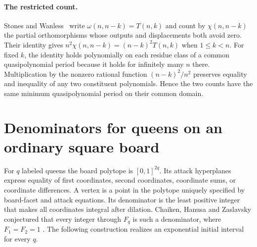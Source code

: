 \documentclass[10pt]{article}
\begin{document}
\paragraph{The restricted count.} Stones and Wanless~\cite{partial} write $\omega(n,n-k)=T(n,k)$ and count by $\chi(n,n-k)$ the partial orthomorphisms whose outputs and displacements both avoid zero. Their identity gives $n^2\chi(n,n-k)=(n-k)^2T(n,k)$ when $1\le k<n$. For fixed $k$, the identity holds polynomially on each residue class of a common quasipolynomial period because it holds for infinitely many $n$ there. Multiplication by the nonzero rational function $(n-k)^2/n^2$ preserves equality and inequality of any two constituent polynomials. Hence the two counts have the same minimum quasipolynomial period on their common domain.

\section{Denominators for queens on an ordinary square board}

For $q$ labeled queens the board polytope is $[0,1]^{2q}$. Its attack hyperplanes express equality of first coordinates, second coordinates, coordinate sums, or coordinate differences. A vertex is a point in the polytope uniquely specified by board-facet and attack equations. Its denominator is the least positive integer that makes all coordinates integral after dilation. Chaiken, Hanusa and Zaslavsky conjectured that every integer through $F_q$ is such a denominator, where $F_1=F_2=1$ \cite[Conjecture 6.2]{chz}. The following construction realizes an exponential initial interval for every $q$.
\end{document}
